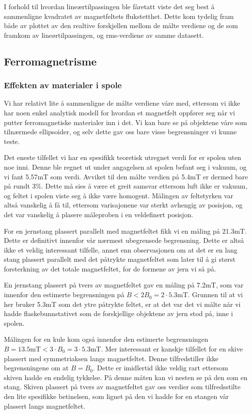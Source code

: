 \documentclass[a4paper,11pt, twocolumn]{article}
\begin{document}
I forhold til hvordan lineærtilpassingen ble fåretatt viste det seg best å sammenligne kvadratet av magnetfeltets flukstetthet. Dette kom tydelig fram både av plottet av den realtive forskjellen mellom de målte verdiene og de som framkom av lineørtilpassingen, og rms-verdiene av samme datasett.
\subsection{Ferromagnetrisme}
\subsubsection{Effekten av materialer i spole}
Vi har relativt lite å sammenligne de målte verdiene våre med, ettersom vi ikke har noen enkel analytisk modell for hvordan et magnetfelt oppfører seg når vi putter ferromagnetiske materialer inn i det. Vi kan bare se på objektene våre som tilnærmede ellipsoider, og selv dette gav oss bare visse begrensninger vi kunne teste. 

Det eneste tilfellet vi har en spesifikk teoretisk utregnet verdi for er spolen uten noe inni. Denne ble regnet ut under angagelsen at spolen befant seg i vakuum, og vi fant 5.57mT som verdi. Avviket til den målte verdien på 5.4mT er dermed bare på rundt 3\%. Dette må sies å være et greit samsvar ettersom luft ikke er vakuum, og feltet i spolen viste seg å ikke være homogent. Målingen av feltstyrken var altså vanskelig å få til, ettersom varisajonene var sterkt avhengig av posisjon, og det var vanskelig å plasere måleproben i en veldefinert posisjon.

For en jernstang plassert parallelt med magnetfeltet fikk vi en måling på 21.3mT. Dette er definitivt innenfor vår nærmest ubegrensede begrensning. Dette er altså ikke et veldig interessant tilfelle, annet enn observasjonen om at det er en lang stang plassert parallelt med det påtrykte magnetfeltet som later til å gi størst forsterkning av det totale magnetfeltet, for de formene av jern vi så på.

En jernstang plassert på tvers av magnetfeltet gav en måling på 7.2mT, som var innenfor den estimerte begrensningen på $B<2B_0 = 2\cdot5.3$mT. Grunnen til at vi her bruker 5.3mT som det ytre påtrykte feltet, er at det var det vi målte når vi hadde flaskebunnstativet som de forskjellige objektene av jern stod på, inne i spolen.

Målingen for en kule kom også innenfor den estimerte begrensningen $B=13.5\text{mT}<3\cdot B_0=3\cdot 5.3$mT. Mer interessant er kanskje tilfellet for en skive plassert med symmetriaksen langs magnetfeltet. Denne tilfredstiller ikke begrensningene om at $B=B_0$. Dette er imidlertid ikke veldig rart ettersom skiven hadde en endelig tykkelse. På denne måten kan vi nesten se på den som en stang. Skiven plassert på tvers av magnetfeltet gav oss verdier som tilfredsstilte den lite spesifikke betinelsen, som lignet på den vi hadde for en stangen vår plassert langs magnetfeltet.
\end{document}
